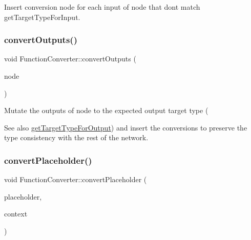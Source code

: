 Insert conversion node for each input of {\ttfamily node} that don\textquotesingle{}t match get\+Target\+Type\+For\+Input. \mbox{\label{classglow_1_1_function_converter_a43d6b9f872bceb962dfb3e492158e112}} 
\subsubsection{\texorpdfstring{convert\+Outputs()}{convertOutputs()}}
{\footnotesize\ttfamily void Function\+Converter\+::convert\+Outputs (\begin{DoxyParamCaption}\item[{\hyperlink{classglow_1_1_node}{Node} \&}]{node }\end{DoxyParamCaption})\hspace{0.3cm}{\ttfamily [protected]}}

Mutate the outputs of {\ttfamily node} to the expected output target type (\begin{DoxySeeAlso}{See also}
\hyperlink{classglow_1_1_function_converter_a015dfed23796395ce34c7ca4766c7854}{get\+Target\+Type\+For\+Output}) and insert the conversions to preserve the type consistency with the rest of the network. 
\end{DoxySeeAlso}
\mbox{\label{classglow_1_1_function_converter_a2cd1261cd954bfdff28d3f7a08136dad}} 
\subsubsection{\texorpdfstring{convert\+Placeholder()}{convertPlaceholder()}}
{\footnotesize\ttfamily void Function\+Converter\+::convert\+Placeholder (\begin{DoxyParamCaption}\item[{\hyperlink{classglow_1_1_placeholder}{Placeholder} \&}]{placeholder,  }\item[{\hyperlink{classglow_1_1_placeholder_bindings}{Placeholder\+Bindings} $\ast$}]{context }\end{DoxyParamCaption})}

